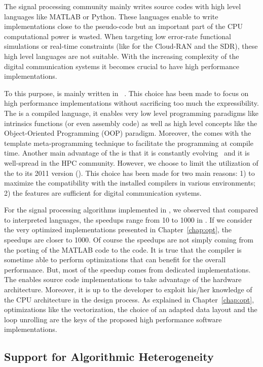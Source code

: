 The signal processing community mainly writes source codes with high level
languages like MATLAB or Python. These languages enable to write implementations
close to the pseudo-code but an important part of the CPU computational power is
wasted. When targeting low error-rate functional simulations or real-time
constraints (like for the Cloud-RAN and the SDR), these high level languages are
not suitable. With the increasing complexity of the digital communication
systems it becomes crucial to have high performance implementations.

To this purpose, \AFFECT is mainly written in \Cxx~\cite{Stroustrup2013}. This
choice has been made to focus on high performance implementations without
sacrificing too much the expressibility. The \Cxx is a compiled language, it
enables very low level programming paradigms like intrinsics functions (or even
assembly code) as well as high level concepts like the Object-Oriented
Programming (OOP) paradigm. Moreover, the \Cxx comes with the template
meta-programming technique to facilitate the programming at compile time.
Another main advantage of the \Cxx is that it is constantly
evolving~\cite{Stroustrup2020} and it is well-spread in the HPC community.
However, we choose to limit the utilization of the \Cxx to its 2011 version
(). This choice has been made for two main reasons: 1) to maximize the
compatibility with the installed compilers in various environments; 2) the
 features are sufficient for digital communication systems.

For the signal processing algorithms implemented in \AFFECT, we observed that
compared to interpreted languages, the speedups range from 10 to 1000 in \Cxx.
If we consider the very optimized implementations presented in
Chapter~\ref{chap:opt}, the speedups are closer to 1000. Of course the speedups
are not simply coming from the porting of the MATLAB code to the \Cxx code. It
is true that the compiler is sometime able to perform optimizations that can
benefit for the overall performance. But, most of the speedup comes from
dedicated implementations. The \Cxx enables source code implementations to take
advantage of the hardware architecture. Moreover, it is up to the developer to
exploit his/her knowledge of the CPU architecture in the design process. As
explained in Chapter~\ref{chap:opt}, optimizations like the vectorization, the
choice of an adapted data layout and the loop unrolling are the keys of the
proposed high performance software implementations.

\subsection{Support for Algorithmic Heterogeneity}


